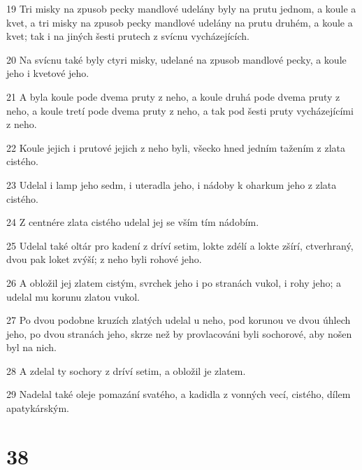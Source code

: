 \par 19 Tri misky na zpusob pecky mandlové udelány byly na prutu jednom, a koule a kvet, a tri misky na zpusob pecky mandlové udelány na prutu druhém, a koule a kvet; tak i na jiných šesti prutech z svícnu vycházejících.
\par 20 Na svícnu také byly ctyri misky, udelané na zpusob mandlové pecky, a koule jeho i kvetové jeho.
\par 21 A byla koule pode dvema pruty z neho, a koule druhá pode dvema pruty z neho, a koule tretí pode dvema pruty z neho, a tak pod šesti pruty vycházejícími z neho.
\par 22 Koule jejich i prutové jejich z neho byli, všecko hned jedním tažením z zlata cistého.
\par 23 Udelal i lamp jeho sedm, i uteradla jeho, i nádoby k oharkum jeho z zlata cistého.
\par 24 Z centnére zlata cistého udelal jej se vším tím nádobím.
\par 25 Udelal také oltár pro kadení z dríví setim, lokte zdélí a lokte zšírí, ctverhraný, dvou pak loket zvýší; z neho byli rohové jeho.
\par 26 A obložil jej zlatem cistým, svrchek jeho i po stranách vukol, i rohy jeho; a udelal mu korunu zlatou vukol.
\par 27 Po dvou podobne kruzích zlatých udelal u neho, pod korunou ve dvou úhlech jeho, po dvou stranách jeho, skrze než by provlacováni byli sochorové, aby nošen byl na nich.
\par 28 A zdelal ty sochory z dríví setim, a obložil je zlatem.
\par 29 Nadelal také oleje pomazání svatého, a kadidla z vonných vecí, cistého, dílem apatykárským.

\chapter{38}


